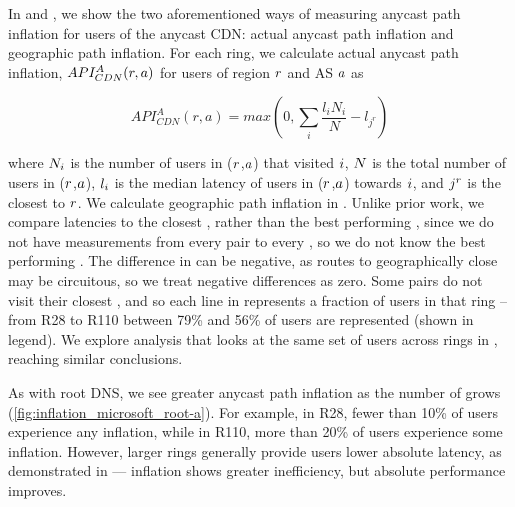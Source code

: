 \documentclass[sigconf,letterpaper,nonacm,10pt,anonymous]{acmart}
\begin{document}
In  and
, we show the two aforementioned
ways of measuring anycast path inflation for users of the anycast CDN:
actual anycast path inflation and geographic path inflation. For each
ring, we calculate actual anycast path inflation,
\(\mathnormal{API^A_{CDN}(r,a)}\) for users of region \(\mathnormal{r}\)
and AS \(\mathnormal{a}\) as

\begin{equation}
\label{eq:cdn_api_calc}
API^A_{CDN}(r,a) = max(0, \sum_{i} \frac{l_i N_i}{N} - l_{{j^r}})
\end{equation}

where \(\mathnormal{N_i}\) is the number of users in
(\(\mathnormal{r}\),\(\mathnormal{a}\)) that visited
\fe \(\mathnormal{i}\), \(\mathnormal{N}\) is the total number of users
in (\(\mathnormal{r}\),\(\mathnormal{a}\)), \(\mathnormal{l_i}\) is the
median latency of users in (\(\mathnormal{r}\),\(\mathnormal{a}\))
towards \fe \(\mathnormal{i}\), and \fe \(\mathnormal{j^r}\) is the
closest \fe to \(\mathnormal{r}\). We calculate geographic path
inflation in . Unlike prior work, we
compare latencies to the closest \fe, rather than the best performing
\fe \cite{calder2015analyzing,li_levin_spring_bhattacharjee_2018}, since
we do not have measurements from every \metroas pair to every \fe, so we
do not know the best performing \fe. The difference in
 can be negative, as routes to geographically
close \feplural may be circuitous, so we treat negative differences as
zero. \iffalse Each ring has different \feplural, so the closest \fe to
a \metroas may change depending on the ring. \fi Some \metroas pairs do
not visit their closest \fe, and so each line in
 represents a fraction of users in
that ring -- from R28 to R110 between 79\% and 56\% of users are
represented (shown in legend). We explore analysis that looks at the
same set of users across rings in
, reaching similar
conclusions.

As with root DNS, we see greater anycast path inflation as the number of
\feplural grows (\cref{fig:inflation_microsoft_root-a}). For example, in
R28, fewer than 10\% of users experience any inflation, while in R110,
more than 20\% of users experience some inflation. However, larger rings
generally provide users lower absolute latency, as demonstrated in
 --- inflation shows greater
inefficiency, but absolute performance improves.
\end{document}
